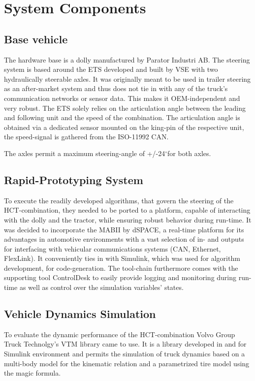 \documentclass[root.tex]{subfiles}
\begin{document}
{\pagestyle{empty}}
\section{System Components}
\label{chap:Hardware-Setup}
\subsection{Base vehicle}
\label{sec:basevehicle}

The hardware base is a dolly manufactured by Parator Industri AB\cite{paratorAB}. The steering system is based around the \gls{ETS} developed and built by \gls{VSE}\cite{vse} with two hydraulically steerable axles. It was originally meant to be used in trailer steering as an after-market system and thus does not tie in with any of the truck's communication networks or sensor data. This makes it OEM-independent and very robust. The \gls{ETS} solely relies on the articulation angle between the leading and following unit and the speed of the combination. The articulation angle is obtained via a dedicated sensor mounted on the king-pin of the respective unit, the speed-signal is gathered from the ISO-11992 \gls{CAN}. 

The axles permit a maximum steering-angle of +/-24$^{\circ}$for both axles. 
\subsection{Rapid-Prototyping System}

To execute the readily developed algorithms, that govern the steering of the \gls{HCT}-combination, they needed to be ported to a platform, capable of interacting with the dolly and the tractor, while ensuring robust behavior during run-time. It was decided to incorporate the \gls{MABII}\cite{mabii} by dSPACE\cite{dspace}, a real-time platform for its advantages in automotive environments with a vast selection of in- and outputs for interfacing with vehicular communications systems (\gls{CAN}, Ethernet, FlexLink). It conveniently ties in with Simulink, which was used for algorithm development, for code-generation. %
 The tool-chain furthermore comes with the supporting tool ControlDesk to easily provide logging and monitoring during run-time as well as control over the simulation variables' states.


\subsection{Vehicle Dynamics Simulation}
To evaluate the dynamic performance of the \gls{HCT}-combination Volvo Group Truck Technolgy's\cite{volvogtt} \gls{VTM} library came to use. It is a library developed in and for Simulink environment and permits the simulation of truck dynamics based on a multi-body model for the kinematic relation and a parametrized tire model using the magic formula.
\end{document}
